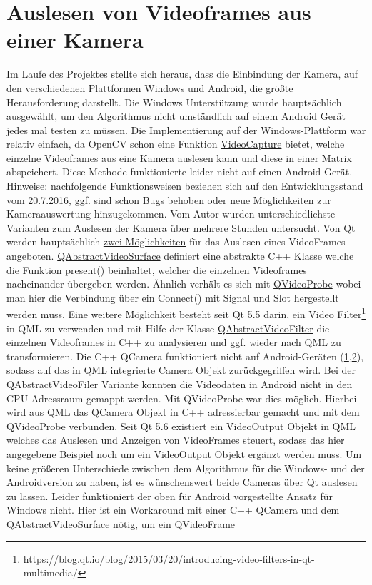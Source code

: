 \section{Auslesen von Videoframes aus einer Kamera}
Im Laufe des Projektes stellte sich heraus, dass die Einbindung der Kamera, auf den verschiedenen Plattformen Windows und Android, die größte Herausforderung darstellt. Die Windows Unterstützung wurde hauptsächlich ausgewählt, um den Algorithmus nicht umständlich auf einem Android Gerät jedes mal testen zu müssen. Die Implementierung auf der Windows-Plattform war relativ einfach, da OpenCV schon eine Funktion \href{http://docs.opencv.org/3.1.0/d8/dfe/classcv_1_1VideoCapture.html}{VideoCapture} bietet, welche einzelne Videoframes aus eine Kamera auslesen kann und diese in einer Matrix abspeichert. Diese Methode funktionierte leider nicht auf einen Android-Gerät. Hinweise: nachfolgende Funktionsweisen beziehen sich auf den Entwicklungsstand vom 20.7.2016, ggf. sind schon Bugs behoben oder neue Möglichkeiten zur Kameraauswertung hinzugekommen. Vom Autor wurden unterschiedlichste Varianten zum Auslesen der Kamera über mehrere Stunden untersucht. Von Qt werden hauptsächlich \href{http://doc.qt.io/qt-5/videooverview.html}{zwei Möglichkeiten} für das Auslesen eines VideoFrames angeboten. \href{http://doc.qt.io/qt-5/qabstractvideosurface.html}{QAbstractVideoSurface} definiert eine abstrakte C++ Klasse welche die Funktion present() beinhaltet, welcher die einzelnen Videoframes nacheinander übergeben werden. Ähnlich verhält es sich mit \href{http://doc.qt.io/qt-5/qvideoprobe.html}{QVideoProbe} wobei man hier die Verbindung über ein Connect() mit Signal und Slot hergestellt werden muss. Eine weitere Möglichkeit besteht seit Qt 5.5 darin, ein Video Filter\footnote{\label{video_filter}https://blog.qt.io/blog/2015/03/20/introducing-video-filters-in-qt-multimedia/} in QML zu verwenden und mit Hilfe der Klasse \href{http://doc.qt.io/qt-5/qabstractvideofilter.html}{QAbstractVideoFilter} die einzelnen Videoframes in C++ zu analysieren und ggf. wieder nach QML zu transformieren. Die C++ QCamera funktioniert nicht auf Android-Geräten (\href{https://bugreports.qt.io/browse/QTBUG-41194}{1},\href{http://stackoverflow.com/questions/28041741/qt-qml-camera-to-c-qimage-on-android}{2}), sodass auf das in QML integrierte Camera Objekt zurückgegriffen wird. Bei der QAbstractVideoFiler Variante konnten die Videodaten in Android nicht in den CPU-Adressraum gemappt werden. Mit QVideoProbe war dies möglich. Hierbei wird aus QML das QCamera Objekt in C++ adressierbar gemacht und mit dem QVideoProbe verbunden. Seit Qt 5.6 existiert ein VideoOutput Objekt in QML welches das Auslesen und Anzeigen von VideoFrames steuert, sodass das hier angegebene \href{http://stackoverflow.com/questions/28041741/qt-qml-camera-to-c-qimage-on-android/33238150\#33238150}{Beispiel} noch um ein VideoOutput Objekt ergänzt werden muss. Um keine größeren Unterschiede zwischen dem Algorithmus für die Windows- und der Androidversion zu haben, ist es wünschenswert beide Cameras über Qt auslesen zu lassen. Leider funktioniert der oben für Android vorgestellte Ansatz für Windows nicht. Hier ist ein Workaround mit einer C++ QCamera und dem QAbstractVideoSurface nötig, um ein QVideoFrame 